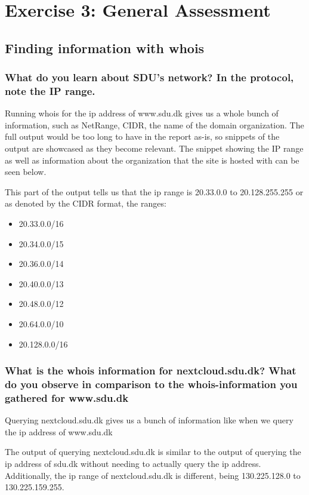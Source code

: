 \section{Exercise 3: General Assessment}

\subsection{Finding information with whois}
\subsubsection{What do you learn about SDU's network? In the protocol, note the IP range.}
Running whois for the ip address of www.sdu.dk gives us a whole bunch of information, such as NetRange, CIDR, the name of the domain organization. The full output would be too long to have in the report as-is, so snippets of the output are showcased as they become relevant. The snippet showing the IP range as well as information about the organization that the site is hosted with can be seen below.



This part of the output tells us that the ip range is 20.33.0.0 to 20.128.255.255 or as denoted by the CIDR format, the ranges:
\begin{itemize}
    \item 20.33.0.0/16
    \item 20.34.0.0/15
    \item 20.36.0.0/14
    \item 20.40.0.0/13
    \item 20.48.0.0/12
    \item 20.64.0.0/10
    \item 20.128.0.0/16
\end{itemize}

\subsubsection{What is the whois information for nextcloud.sdu.dk? What do you observe in comparison to the whois-information you gathered for www.sdu.dk}
Querying nextcloud.sdu.dk gives us a bunch of information like when we query the ip address of www.sdu.dk

The output of querying nextcloud.sdu.dk is similar to the output of querying the ip address of sdu.dk without needing to actually query the ip address. Additionally, the ip range of nextcloud.sdu.dk is different, being 130.225.128.0 to 130.225.159.255.

